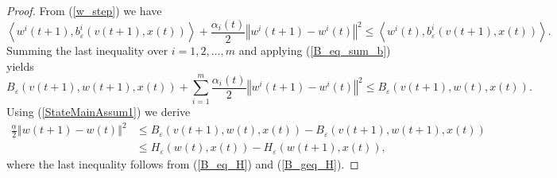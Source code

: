 \documentclass[12pt]{article}
\numberwithin{equation}{section}
\newcommand{\norm}[1]{\left\Vert {#1} \right\Vert} %
\begin{document}
\begin{proof}
From (\ref{w_step}) we have
\begin{equation*}
	\left\langle w^i(t+1),b^i_{\varepsilon}(v(t+1),x(t))\right\rangle + \frac{\alpha_i(t)}{2}\norm{w^i(t+1)-w^i(t)}^2 \leq \left\langle w^i(t),b^i_{\varepsilon}(v(t+1),x(t))\right\rangle.
\end{equation*}
Summing the last inequality over $i=1,2,\ldots,m$ and applying (\ref{B_eq_sum_b}) yields
\begin{equation*}
	B_{\varepsilon}(v(t+1),w(t+1),x(t)) + \sum\limits_{i=1}^m \frac{\alpha_i(t)}{2}\norm{w^i(t+1)-w^i(t)}^2 \leq B_{\varepsilon}(v(t+1),w(t),x(t)).
\end{equation*}
Using (\ref{StateMainAssum1}) we derive 
\begin{align}
	\frac{\underline{\alpha}}{2}\norm{w(t+1)-w(t)}^2 &\leq B_{\varepsilon}(v(t+1),w(t),x(t)) - B_{\varepsilon}(v(t+1),w(t+1),x(t)) \\
	&\leq H_{\varepsilon}(w(t),x(t)) - H_{\varepsilon}(w(t+1),x(t)), \label{SD_in_w}
\end{align}
where the last inequality follows from (\ref{B_eq_H}) and (\ref{B_geq_H}).


\end{proof}
\end{document}
